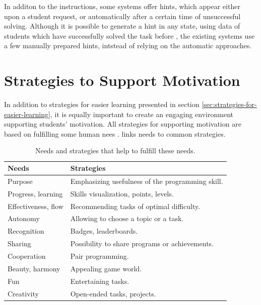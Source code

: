 In additon to the instructions, some systems offer hints, which appear either
  upon a student request, or automatically after a certain time of unsuccessful
  solving. Although it is possible to generate a hint in any state,
  using data of students which have successfully solved the task before
  \cite{generating-hints}, the existing systems use a few manually prepared
  hints, intstead of relying on the automatic approaches.

\section{Strategies to Support Motivation}
\label{sec:motivation}

In addition to strategies for easier learning presented in section
\ref{sec:strategies-for-easier-learning}, it is equally important to create an
engaging environment supporting students’ motivation.
All strategies for supporting motivation are based on fulfilling some human
nees \cite{nvc}. %
 links needs to common strategies.

\begin{table}[htb]
\centering
\begin{tabular}{ll}
\toprule
Needs & Strategies \\
\midrule
Purpose & Emphasizing usefulness of the programming skill. \\ %
Progress, learning & Skills visualization, points, levels. \\
Effectiveness, flow & Recommending tasks of optimal difficulty. \\ %
Autonomy & Allowing to choose a topic or a task. \\
Recognition & Badges, leaderboards. \\  %
Sharing & Possibility to share programs or achievements. \\
Cooperation & Pair programming. \\
Beauty, harmony & Appealing game world. \\ %
Fun & Entertaining tasks. \\
Creativity & Open-ended tasks, projects. \\  %
\bottomrule
\end{tabular}
\caption{Needs and strategies that help to fulfill these needs.}
\label{tbl:motivation-strategies}
\end{table}



